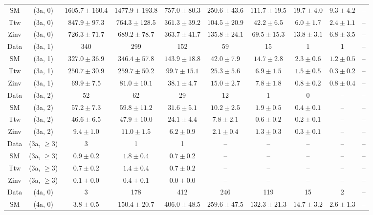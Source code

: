 \begin{table}[h!]
{\begin{tabular}{cccccccccc}
	SM & (3a, 0) & $1605.7\pm 160.4$ & $1477.9\pm 193.8$ & $757.0\pm 80.3$ & $250.6\pm 43.6$ & $111.7\pm 19.5$ & $19.7\pm 4.0$ & $9.3\pm 4.2$ & -- \\[0.5ex] 
	Ttw & (3a, 0) & $847.9\pm 97.3$ & $764.3\pm 128.5$ & $361.3\pm 39.2$ & $104.5\pm 20.9$ & $42.2\pm 6.5$ & $6.0\pm 1.7$ & $2.4\pm 1.1$ & -- \\[0.5ex] 
	Zinv & (3a, 0) & $726.3\pm 71.7$ & $689.2\pm 78.7$ & $363.7\pm 41.7$ & $135.8\pm 24.1$ & $69.5\pm 15.3$ & $13.8\pm 3.1$ & $6.8\pm 3.5$ & -- \\[0.5ex] 
	Data & (3a, 1) & 340 & 299 & 152 & 59 & 15 & 1 & 1 & -- \\[0.5ex] 
	SM & (3a, 1) & $327.0\pm 36.9$ & $346.4\pm 57.8$ & $143.9\pm 18.8$ & $42.0\pm 7.9$ & $14.7\pm 2.8$ & $2.3\pm 0.6$ & $1.2\pm 0.5$ & -- \\[0.5ex] 
	Ttw & (3a, 1) & $250.7\pm 30.9$ & $259.7\pm 50.2$ & $99.7\pm 15.1$ & $25.3\pm 5.6$ & $6.9\pm 1.5$ & $1.5\pm 0.5$ & $0.3\pm 0.2$ & -- \\[0.5ex] 
	Zinv & (3a, 1) & $69.9\pm 7.5$ & $81.0\pm 10.1$ & $38.1\pm 4.7$ & $15.0\pm 2.7$ & $7.8\pm 1.8$ & $0.8\pm 0.2$ & $0.8\pm 0.4$ & -- \\[0.5ex] 
	Data & (3a, 2) & 52 & 62 & 29 & 12 & 1 & 0 & -- & -- \\[0.5ex] 
	SM & (3a, 2) & $57.2\pm 7.3$ & $59.8\pm 11.2$ & $31.6\pm 5.1$ & $10.2\pm 2.5$ & $1.9\pm 0.5$ & $0.4\pm 0.1$ & -- & -- \\[0.5ex] 
	Ttw & (3a, 2) & $46.6\pm 6.5$ & $47.9\pm 10.0$ & $24.1\pm 4.4$ & $7.8\pm 2.1$ & $0.6\pm 0.2$ & $0.2\pm 0.1$ & -- & -- \\[0.5ex] 
	Zinv & (3a, 2) & $9.4\pm 1.0$ & $11.0\pm 1.5$ & $6.2\pm 0.9$ & $2.1\pm 0.4$ & $1.3\pm 0.3$ & $0.3\pm 0.1$ & -- & -- \\[0.5ex] 
	Data & (3a, $\ge3$) & 3 & 1 & 1 & -- & -- & -- & -- & -- \\[0.5ex] 
	SM & (3a, $\ge3$) & $0.9\pm 0.2$ & $1.8\pm 0.4$ & $0.7\pm 0.2$ & -- & -- & -- & -- & -- \\[0.5ex] 
	Ttw & (3a, $\ge3$) & $0.7\pm 0.2$ & $1.4\pm 0.4$ & $0.7\pm 0.2$ & -- & -- & -- & -- & -- \\[0.5ex] 
	Zinv & (3a, $\ge3$) & $0.1\pm 0.0$ & $0.4\pm 0.1$ & $0.0\pm 0.0$ & -- & -- & -- & -- & -- \\[0.5ex] 
	Data & (4a, 0) & 3 & 178 & 412 & 246 & 119 & 15 & 2 & -- \\[0.5ex] 
	SM & (4a, 0) & $3.8\pm 0.5$ & $150.4\pm 20.7$ & $406.0\pm 48.5$ & $259.6\pm 47.5$ & $132.3\pm 21.3$ & $14.7\pm 3.2$ & $2.6\pm 1.3$ & -- \\[0.5ex] 

\end{tabular}}
\end{table}
